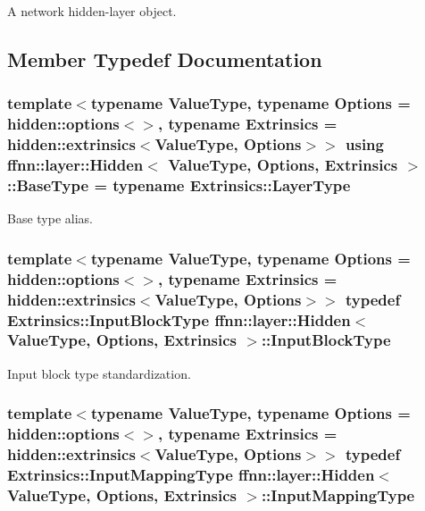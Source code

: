 A network hidden-\/layer object. 

\subsection{Member Typedef Documentation}
\hypertarget{classffnn_1_1layer_1_1_hidden_af146958f4a1b59faba4ae2b2eb521faf}{
\subsubsection[{Base\-Type}]{\setlength{\rightskip}{0pt plus 5cm}template$<$typename Value\-Type, typename Options = hidden\-::options$<$$>$, typename Extrinsics = hidden\-::extrinsics$<$\-Value\-Type, Options$>$$>$ using {\bf ffnn\-::layer\-::\-Hidden}$<$ Value\-Type, Options, Extrinsics $>$\-::{\bf Base\-Type} =  typename Extrinsics\-::\-Layer\-Type}}\label{classffnn_1_1layer_1_1_hidden_af146958f4a1b59faba4ae2b2eb521faf}


Base type alias. 

\hypertarget{classffnn_1_1layer_1_1_hidden_abd5a3b5c55984948f903fe88759efaf4}{
\subsubsection[{Input\-Block\-Type}]{\setlength{\rightskip}{0pt plus 5cm}template$<$typename Value\-Type, typename Options = hidden\-::options$<$$>$, typename Extrinsics = hidden\-::extrinsics$<$\-Value\-Type, Options$>$$>$ typedef Extrinsics\-::\-Input\-Block\-Type {\bf ffnn\-::layer\-::\-Hidden}$<$ Value\-Type, Options, Extrinsics $>$\-::{\bf Input\-Block\-Type}}}\label{classffnn_1_1layer_1_1_hidden_abd5a3b5c55984948f903fe88759efaf4}


Input block type standardization. 

\hypertarget{classffnn_1_1layer_1_1_hidden_ac518f2e2be1250c1af7b2f8574cadc8d}{
\subsubsection[{Input\-Mapping\-Type}]{\setlength{\rightskip}{0pt plus 5cm}template$<$typename Value\-Type, typename Options = hidden\-::options$<$$>$, typename Extrinsics = hidden\-::extrinsics$<$\-Value\-Type, Options$>$$>$ typedef Extrinsics\-::\-Input\-Mapping\-Type {\bf ffnn\-::layer\-::\-Hidden}$<$ Value\-Type, Options, Extrinsics $>$\-::{\bf Input\-Mapping\-Type}}}\label{classffnn_1_1layer_1_1_hidden_ac518f2e2be1250c1af7b2f8574cadc8d}


